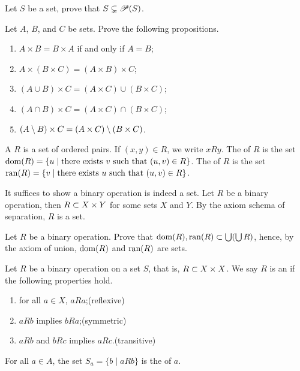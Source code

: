 \documentclass[10pt]{article}
\begin{document}
\begin{problem}
    Let $S$ be a set, prove that $S\subsetneq\mathscr{P}(S)$. 
\end{problem}
\begin{problem}
    Let $A$, $B$, and $C$ be sets. Prove the following propositions.
    \begin{enumerate}
        \item $A\times B=B\times A$ if and only if $A=B$;
        \item $A\times(B\times C)=(A\times B)\times C$;
        \item $(A\cup B)\times C=(A\times C)\cup(B\times C)$;
        \item $(A\cap B)\times C=(A\times C)\cap(B\times C)$;
        \item $(A\setminus B)\times C=(A\times C)\setminus(B\times C)$.
    \end{enumerate}
\end{problem}
\begin{definition}
    A  $R$ is a set of ordered pairs. If $(x,y)\in R$, we write $xRy$. The  of $R$ is the set $\operatorname{dom}(R)=\{u\mid\text{there exists}\ v\ \text{such that}\ (u,v)\in R\}$. The  of $R$ is the set $\operatorname{ran}(R)=\{v\mid\text{there exists}\ u\ \text{such that}\ (u,v)\in R\}$. 
\end{definition}
\par
It suffices to show a binary operation is indeed a set. Let $R$ be a binary operation, then $R\subset X\times Y$ for some sets $X$ and $Y$. By the axiom schema of separation, $R$ is a set. 
\begin{problem}
    Let $R$ be a binary operation. Prove that $\operatorname{dom}(R),\operatorname{ran}(R)\subset\bigcup(\bigcup R)$, hence, by the axiom of union, $\operatorname{dom}(R)$ and $\operatorname{ran}(R)$ are sets.
\end{problem}
\begin{definition}
    Let $R$ be a binary operation on a set $S$, that is, $R\subset X\times X$. We say $R$ is an  if the following properties hold.
    \begin{enumerate}
        \item for all $a\in X$, $aRa$;\hfill(reflexive)
        \item $aRb$ implies $bRa$;\hfill(symmetric)
        \item $aRb$ and $bRc$ implies $aRc$.\hfill(transitive)
    \end{enumerate}
    For all $a\in A$, the set ${S}_{a}=\{b\mid aRb\}$ is the  of $a$. 
\end{definition}
\end{document}
